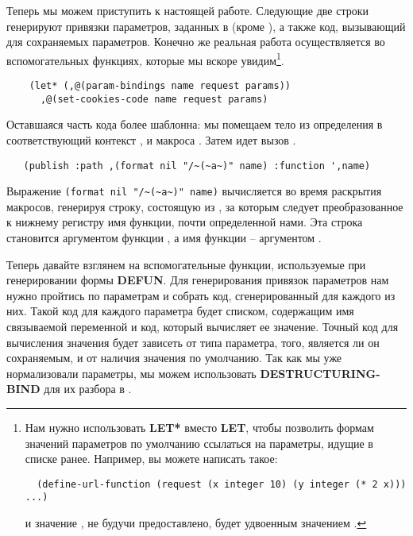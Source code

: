 Теперь мы можем приступить к настоящей работе. Следующие две строки генерируют привязки
параметров, заданных в  (кроме ), а также код,
вызывающий  для сохраняемых параметров. Конечно же реальная работа
осуществляется во вспомогательных функциях, которые мы вскоре увидим\footnote{Нам нужно
  использовать \textbf{LET* } вместо \textbf{LET}, чтобы позволить формам значений
  параметров по умолчанию ссылаться на параметры, идущие в списке ранее. Например, вы
  можете написать такое:

\begin{lstlisting}
  (define-url-function (request (x integer 10) (y integer (* 2 x))) ...)
\end{lstlisting}

и значение , не будучи предоставлено, будет удвоенным значением .}.

\begin{lstlisting}
    (let* (,@(param-bindings name request params))
      ,@(set-cookies-code name request params)
\end{lstlisting}

Оставшаяся часть кода более шаблонна: мы помещаем тело из определения
 в соответствующий контекст ,
 и макроса . Затем идет вызов .

\begin{lstlisting}
   (publish :path ,(format nil "/~(~a~)" name) :function ',name)
\end{lstlisting}

Выражение \lstinline!(format nil "/~(~a~)" name)! вычисляется во время раскрытия макросов,
генерируя строку, состоящую из \code{/}, за которым следует преобразованное к нижнему
регистру имя функции, почти определенной нами. Эта строка становится аргументом
 функции , а имя функции -- аргументом .

Теперь давайте взглянем на вспомогательные функции, используемые при генерировании формы
\textbf{DEFUN}. Для генерирования привязок параметров нам нужно пройтись по параметрам и
собрать код, сгенерированный  для каждого из них. Такой код для
каждого параметра будет списком, содержащим имя связываемой переменной и код, который
вычисляет ее значение. Точный код для вычисления значения будет зависеть от типа
параметра, того, является ли он сохраняемым, и от наличия значения по умолчанию. Так как
мы уже нормализовали параметры, мы можем использовать \textbf{DESTRUCTURING-BIND} для их
разбора в .

